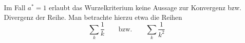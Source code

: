 Im Fall $a^*=1$ erlaubt das Wurzelkriterium keine Aussage zur Konvergenz bzw. Divergenz der Reihe. Man betrachte hierzu etwa die Reihen
$$\sum_k \frac{1}{k} \qquad \text{bzw.} \qquad \sum_k \frac{1}{k^2}$$